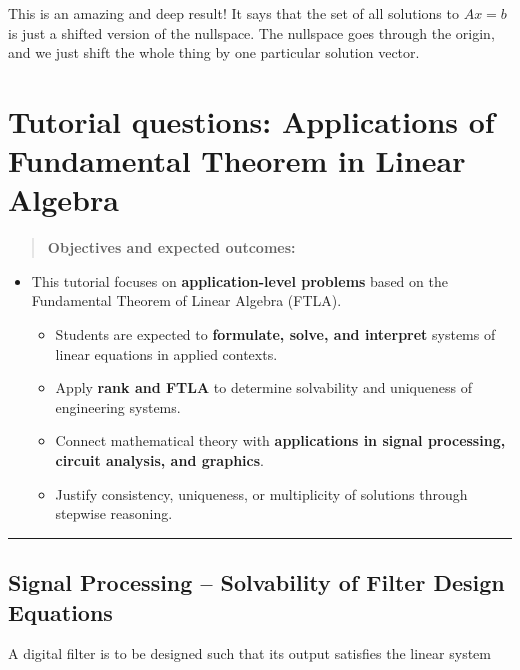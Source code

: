 \documentclass[
  letterpaper,
  DIV=11,
  numbers=noendperiod]{scrreprt}
\begin{document}
This is an amazing and deep result! It says that the set of all
solutions to \(Ax = b\) is just a shifted version of the nullspace. The
nullspace goes through the origin, and we just shift the whole thing by
one particular solution vector.

\section{Tutorial questions: Applications of Fundamental Theorem in
Linear
Algebra}\label{tutorial-questions-applications-of-fundamental-theorem-in-linear-algebra}

\begin{quote}
\textbf{Objectives and expected outcomes:}
\end{quote}

\begin{itemize}
\item
  This tutorial focuses on \textbf{application-level problems} based on
  the Fundamental Theorem of Linear Algebra (FTLA).

  \begin{itemize}
  \item
    Students are expected to \textbf{formulate, solve, and interpret}
    systems of linear equations in applied contexts.
  \item
    Apply \textbf{rank and FTLA} to determine solvability and uniqueness
    of engineering systems.\\
  \item
    Connect mathematical theory with \textbf{applications in signal
    processing, circuit analysis, and graphics}.\\
  \item
    Justify consistency, uniqueness, or multiplicity of solutions
    through stepwise reasoning.
  \end{itemize}
\end{itemize}

\begin{center}\rule{0.5\linewidth}{0.5pt}\end{center}

\subsection{Signal Processing -- Solvability of Filter Design
Equations}\label{signal-processing-solvability-of-filter-design-equations}

A digital filter is to be designed such that its output satisfies the
linear system
\end{document}
